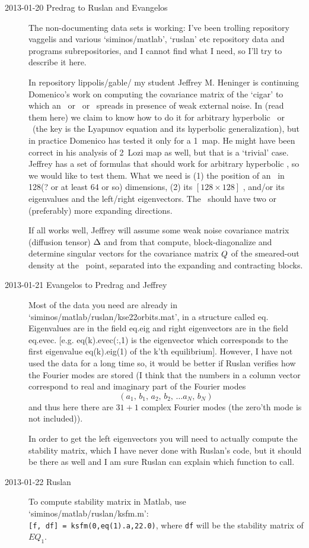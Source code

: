 \begin{description}
\item[2013-01-20  Predrag
to Ruslan and Evangelos]
The non-documenting data sets is working: I've been trolling
repository vaggelis and various `siminos/matlab', `ruslan' etc
repository data and programs subrepositories, and I cannot find what
I need, so I'll try to describe it here.

In repository lippolis/gable/ my student Jeffrey M. Heninger is
continuing Do\-me\-ni\-co's work on computing the covariance matrix of the
`cigar' to which an \eqv\ or \po\ or \rpo\ spreads in presence of
weak external noise. In  (read them
{here}) we claim to know how to do it for arbitrary hyperbolic \eqv\
or \po\ (the key is the Lyapunov equation and its hyperbolic
generalization), but in practice Domenico has tested it only for a
1\dmn\ map. He might have been correct in his analysis of 2\dmn\ Lozi
map as well, but that is a `trivial' case. Jeffrey has a set of
formulas that should work for arbitrary hyperbolic \eqv, so we would
like to test them. What we need is (1) the position of an \eqv\ in
128(? or at least 64 or so) dimensions, (2) its $[128\!\times\!128]$
{\stabmat} {\Mvar}, and/or its eigenvalues and the left/right
eigenvectors. The \eqv\ should have two or (preferably) more
expanding directions.

If all works well, Jeffrey will assume some weak noise covariance
matrix (diffusion tensor) $\Delta$ and from that compute,
block-diagonalize and determine singular vectors for the covariance matrix
$Q$ of the smeared-out density at the \eqv\ point, separated
into the expanding and contracting blocks.

\item[2013-01-21 Evangelos to Predrag and Jeffrey] Most of the data you need are
already in `siminos/matlab/ruslan/kse22orbits.mat', in a structure called eq.
Eigenvalues are in the field eq.eig and right eigenvectors are in the field eq.evec.
[e.g. eq(k).evec(:,1) is the eigenvector which corresponds to the first eigenvalue eq(k).eig(1)
of the k'th equilibrium]. However, I have not used the data for a long time so, it would
be better if Ruslan verifies how the Fourier modes are stored (I think that the numbers
in a column vector correspond to real and imaginary part of the Fourier modes
\[
 (a_1,\, b_1,\, a_2,\, b_2,\, \ldots a_N,\, b_N)
\]
and thus here there are $31+1$ complex Fourier modes (the zero'th mode is not included)).

In order to get the left eigenvectors you will need to actually compute the
stability matrix, which I have never done with Ruslan's code, but it should be
there as well and I am sure Ruslan can explain which function to call.
\item[2013-01-22 Ruslan] To compute stability matrix in Matlab, use `siminos/matlab/ruslan/ksfm.m':\\ {\tt [f, df] = ksfm(0,eq(1).a,22.0)}, where {\tt df} will be the stability matrix of $EQ_1$.


\end{description}
